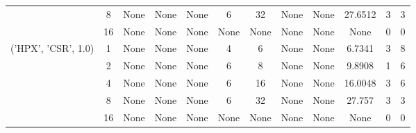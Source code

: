 \begin{tabular}{cccccccccccc}
& 8& None& None& None& 6& 32& None& None& 27.6512& 3& 3\\
& 16& None& None& None& None& None& None& None& None& 0& 0\\
\hline
\multirow{5}{*}{('HPX', 'CSR', 1.0)}& 1& None& None& None& 4& 6& None& None& 6.7341& 3& 8\\
& 2& None& None& None& 6& 8& None& None& 9.8908& 1& 6\\
& 4& None& None& None& 6& 16& None& None& 16.0048& 3& 6\\
& 8& None& None& None& 6& 32& None& None& 27.757& 3& 3\\
& 16& None& None& None& None& None& None& None& None& 0& 0\\
\hline
\end{tabular}
